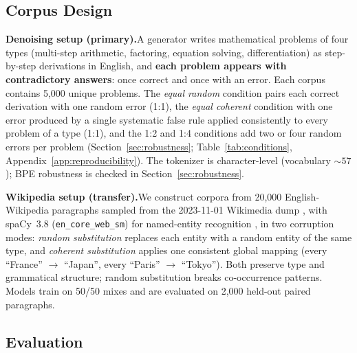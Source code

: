 \documentclass{article}
\begin{document}
\subsection{Corpus Design}
\label{sec:corpus}

\textbf{Denoising setup (primary).}\quad A generator writes mathematical problems of four types (multi-step arithmetic, factoring, equation solving, differentiation) as step-by-step derivations in English, and \textbf{each problem appears with contradictory answers}: once correct and once with an error. Each corpus contains 5{,}000 unique problems. The \emph{equal random} condition pairs each correct derivation with one random error (1:1), the \emph{equal coherent} condition with one error produced by a single systematic false rule applied consistently to every problem of a type (1:1), and the 1:2 and 1:4 conditions add two or four random errors per problem (Section~\ref{sec:robustness}; Table~\ref{tab:conditions}, Appendix~\ref{app:reproducibility}). The tokenizer is character-level (vocabulary ${\sim}57$); BPE robustness is checked in Section~\ref{sec:robustness}.

\textbf{Wikipedia setup (transfer).}\quad We construct corpora from 20{,}000 English-Wikipedia paragraphs sampled from the 2023-11-01 Wikimedia dump \citep{wikimedia2023enwiki}, with spaCy~3.8 (\texttt{en\_core\_web\_sm}) for named-entity recognition \citep{honnibal2020spacy}, in two corruption modes: \emph{random substitution} replaces each entity with a random entity of the same type, and \emph{coherent substitution} applies one consistent global mapping (every ``France'' $\to$ ``Japan'', every ``Paris'' $\to$ ``Tokyo''). Both preserve type and grammatical structure; random substitution breaks co-occurrence patterns. Models train on 50/50 mixes and are evaluated on 2{,}000 held-out paired paragraphs.

\subsection{Evaluation}
\label{sec:evaluation}
\end{document}
